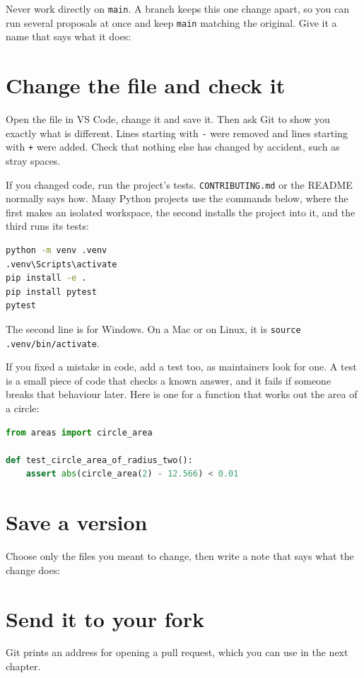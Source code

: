 Never work directly on \texttt{main}. A branch keeps this one change apart, so you can run several proposals at once and keep \texttt{main} matching the original. Give it a name that says what it does:



\section{Change the file and check it}

Open the file in VS Code, change it and save it. Then ask Git to show you exactly what is different. Lines starting with \texttt{-} were removed and lines starting with \texttt{+} were added. Check that nothing else has changed by accident, such as stray spaces.



If you changed code, run the project's tests. \texttt{CONTRIBUTING.md} or the README normally says how. Many Python projects use the commands below, where the first makes an isolated workspace, the second installs the project into it, and the third runs its tests:

\begin{lstlisting}[language=bash]
python -m venv .venv
.venv\Scripts\activate
pip install -e .
pip install pytest
pytest
\end{lstlisting}

The second line is for Windows. On a Mac or on Linux, it is \texttt{source .venv/bin/activate}.

If you fixed a mistake in code, add a test too, as maintainers look for one. A test is a small piece of code that checks a known answer, and it fails if someone breaks that behaviour later. Here is one for a function that works out the area of a circle:

\begin{lstlisting}[language=python]
from areas import circle_area

def test_circle_area_of_radius_two():
    assert abs(circle_area(2) - 12.566) < 0.01
\end{lstlisting}

\section{Save a version}

Choose only the files you meant to change, then write a note that says what the change does:



\section{Send it to your fork}



Git prints an address for opening a pull request, which you can use in the next chapter.
